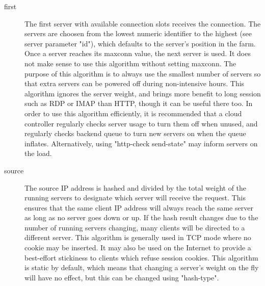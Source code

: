 \begin{description}
      \item[first]
                  The first server with available connection slots receives the
                  connection. The servers are choosen from the lowest numeric
                  identifier to the highest (see server parameter "id"), which
                  defaults to the server's position in the farm. Once a server
                  reaches its maxconn value, the next server is used. It does
                  not make sense to use this algorithm without setting maxconn.
                  The purpose of this algorithm is to always use the smallest
                  number of servers so that extra servers can be powered off
                  during non-intensive hours. This algorithm ignores the server
                  weight, and brings more benefit to long session such as RDP
                  or IMAP than HTTP, though it can be useful there too. In
                  order to use this algorithm efficiently, it is recommended
                  that a cloud controller regularly checks server usage to turn
                  them off when unused, and regularly checks backend queue to
                  turn new servers on when the queue inflates. Alternatively,
                  using "http-check send-state" may inform servers on the load.

      \item[source]
                  The source IP address is hashed and divided by the total
                  weight of the running servers to designate which server will
                  receive the request. This ensures that the same client IP
                  address will always reach the same server as long as no
                  server goes down or up. If the hash result changes due to the
                  number of running servers changing, many clients will be
                  directed to a different server. This algorithm is generally
                  used in TCP mode where no cookie may be inserted. It may also
                  be used on the Internet to provide a best-effort stickiness
                  to clients which refuse session cookies. This algorithm is
                  static by default, which means that changing a server's
                  weight on the fly will have no effect, but this can be
                  changed using "hash-type".


\end{description}
